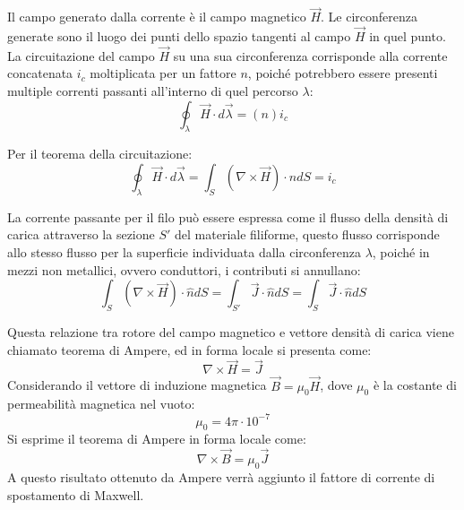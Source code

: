 \documentclass{article}
\numberwithin{equation}{subsection}
\begin{document}
Il campo generato dalla corrente è il campo magnetico $\vec{H}$. Le circonferenza generate sono il luogo dei punti dello spazio tangenti al campo $\vec{H}$ 
in quel punto. La circuitazione del campo $\vec{H}$ su una sua circonferenza corrisponde alla corrente concatenata $i_c$ moltiplicata per un fattore $n$, poiché potrebbero essere presenti multiple 
correnti passanti all'interno di quel percorso $\lambda$: 
\begin{equation*}
    \displaystyle\oint_{\lambda}\vec{H}\cdot d\vec{\lambda}=(n)i_c
\end{equation*}

Per il teorema della circuitazione:
\begin{equation*}
    \displaystyle\oint_{\lambda}\vec{H}\cdot d\vec{\lambda}=\int_S(\nabla\times\vec{H})\cdot\hat{n}dS=i_c
\end{equation*}

La corrente passante per il filo può essere espressa come il flusso della densità di carica attraverso la sezione $S'$ del materiale filiforme, questo flusso corrisponde allo 
stesso flusso per la superficie individuata dalla circonferenza $\lambda$, poiché in mezzi non metallici, ovvero conduttori, i contributi si annullano:
\begin{equation}
    \displaystyle\int_S(\nabla\times\vec{H})\cdot\hat{n}dS=\int_{S'}\vec{J}\cdot\hat{n}dS=\int_S\vec{J}\cdot\hat{n}dS
\end{equation}

\begin{center}
\end{center}

Questa relazione tra rotore del campo magnetico e vettore densità di carica viene chiamato teorema di Ampere, ed in forma locale si presenta come:
\begin{equation*}
    \nabla\times\vec{H}=\vec{J}
\end{equation*}
Considerando il vettore di induzione magnetica $\vec{B}=\mu_0\vec{H}$, dove $\mu_0$ è la costante di permeabilità magnetica nel vuoto:
\begin{equation*}
    \mu_0=4\pi\cdot10^{-7}
\end{equation*}
Si esprime il teorema di Ampere in forma locale come:
\begin{equation}
    \nabla\times\vec{B}=\mu_0\vec{J}
\end{equation}
A questo risultato ottenuto da Ampere verrà aggiunto il fattore di corrente di spostamento di Maxwell. 
\end{document}
